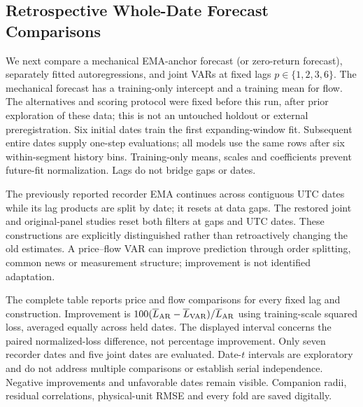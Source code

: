 \subsection{Retrospective Whole-Date Forecast Comparisons}
We next compare a mechanical EMA-anchor forecast (or zero-return forecast), separately fitted autoregressions, and joint VARs at fixed lags $p\in\{1,2,3,6\}$. The mechanical forecast has a training-only intercept and a training mean for flow. The alternatives and scoring protocol were fixed before this run, after prior exploration of these data; this is not an untouched holdout or external preregistration. Six initial dates train the first expanding-window fit. Subsequent entire dates supply one-step evaluations; all models use the same rows after six within-segment history bins. Training-only means, scales and coefficients prevent future-fit normalization. Lags do not bridge gaps or dates.

The previously reported recorder EMA continues across contiguous UTC dates while its lag products are split by date; it resets at data gaps. The restored joint and original-panel studies reset both filters at gaps and UTC dates. These constructions are explicitly distinguished rather than retroactively changing the old estimates. A price--flow VAR can improve prediction through order splitting, common news or measurement structure; improvement is not identified adaptation.

The complete table reports price and flow comparisons for every fixed lag and construction. Improvement is $100(\overline L_{\rm AR}-\overline L_{\rm VAR})/\overline L_{\rm AR}$ using training-scale squared loss, averaged equally across held dates. The displayed interval concerns the paired normalized-loss difference, not percentage improvement. Only seven recorder dates and five joint dates are evaluated. Date-$t$ intervals are exploratory and do not address multiple comparisons or establish serial independence. Negative improvements and unfavorable dates remain visible. Companion radii, residual correlations, physical-unit RMSE and every fold are saved digitally.


